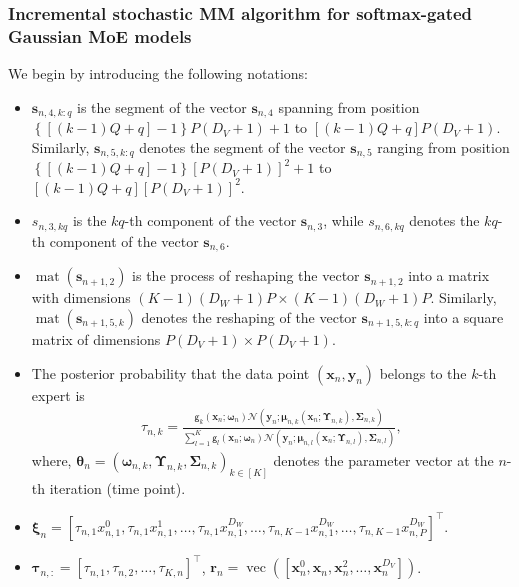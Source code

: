 \documentclass{article}
\newcommand{\mdg}{softmax-gated Gaussian MoE }
\DeclareMathOperator*{\vect}{vec} %
\DeclareMathOperator*{\mat}{mat}
\newcommand{\cN}{\mathcal{N}}
\def\param{\vtheta}
\def\sfg{\mathsf{g}}
\def\vmu{{\bm{\mu}}}
\def\vxi{{\bm{\xi}}}
\def\vtau{{\bm{\tau}}}
\def\vomega{{\bm{\omega}}}
\def\vtheta{{\bm{\theta}}}
\def\vr{{\bm{r}}}
\def\vs{{\bm{s}}}
\def\vx{{\bm{x}}}
\def\vy{{\bm{y}}}
\def\evx{{x}}
\def\mSigma{{\bm{\Sigma}}}
\def\mUpsilon{{\bm{\Upsilon}}}
\begin{document}
\subsubsection{Incremental stochastic MM algorithm for \mdg models}\label{section_onlineMM_SGMoE}
We begin by introducing the following notations:
\begin{itemize}
    \item $\vs_{n,4,k:q}$ is the segment of the vector $\vs_{n,4}$ spanning from position $\left\{[(k-1)Q+q]-1\right\}P(D_{V}+1)+1$ to $[(k-1)Q+q]P(D_{V}+1)$. Similarly, $\vs_{n,5,k:q}$ denotes the segment of the vector $\vs_{n,5}$ ranging from position $\left\{[(k-1)Q+q]-1\right\}[P(D_{V}+1)]^2+1$ to $[(k-1)Q+q][P(D_{V}+1)]^2$.
    
    \item $s_{n,3,kq}$ is the $kq$-th component of the vector $\vs_{n,3}$, while $s_{n,6,kq}$ denotes the $kq$-th component of the vector $\vs_{n,6}$.

    \item $\mat(\vs_{n+1,2})$ is the process of reshaping the vector $\vs_{n+1,2}$ into a matrix with dimensions $(K-1)(D_W+1)P \times (K-1)(D_W+1)P$. Similarly, $\mat(\vs_{n+1,5,k})$ denotes the reshaping of the vector $\vs_{n+1,5,k:q}$ into a square matrix of dimensions $P(D_{V}+1) \times P(D_{V}+1)$.

    \item The posterior probability that the data point $(\vx_n, \vy_n)$ belongs to the $k$-th expert is
   \begin{align}\label{eq_t_iterations}
       \tau_{n,k}
    =\frac{\sfg_k\left(\vx_n; \vomega_n \right) \cN(\vy_n;\vmu_{n,k} (\vx_n;\mUpsilon_{n,k}),\mSigma_{n,k})}{\sum_{l=1}^{K}\sfg_l\left(\vx_n; \vomega_n \right) 
	\cN(\vy_n;\vmu_{n,l} (\vx_n;\mUpsilon_{n,l}),\mSigma_{n,l})},
   \end{align}
    where, $\param_n = (\vomega_{n,k},\mUpsilon_{n,k},\mSigma_{n,k})_{k\in[K]}$ denotes the parameter vector at the $n$-th iteration (time point).

    \item $\vxi_n=[\tau_{n,1}\evx_{n,1}^{0}, \tau_{n,1}\evx_{n,1}^{1},\dots, \tau_{n,1}\evx_{n,1}^{D_W},\dots,\tau_{n,K-1}\evx_{n,1}^{D_W},\dots,\tau_{n,K-1}\evx_{n,P}^{D_W}]^{\top}$.
    
    \item $\vtau_{n,:}=[\tau_{n,1},\tau_{n,2},\dots,\tau_{K,n}]^{\top}$, $\vr_n = \vect\left(\left[\vx_n^0,\vx_n,\vx_n^2,\ldots,\vx_n^{D_V}\right]\right)$.
    

\end{itemize}
\end{document}
